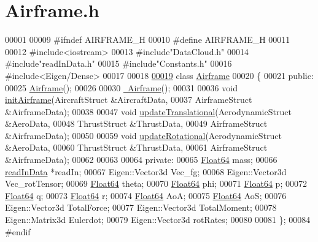 \hypertarget{_airframe_8h_source}{}\section{Airframe.\+h}
\label{_airframe_8h_source}

\begin{DoxyCode}
00001 
00009 \textcolor{preprocessor}{#ifndef AIRFRAME\_H}
00010 \textcolor{preprocessor}{#define AIRFRAME\_H}
00011 
00012 \textcolor{preprocessor}{#include<iostream>}
00013 \textcolor{preprocessor}{#include"DataCloud.h"}
00014 \textcolor{preprocessor}{#include"readInData.h"}
00015 \textcolor{preprocessor}{#include"Constants.h"}
00016 \textcolor{preprocessor}{#include<Eigen/Dense>}
00017 
00018 
\hyperlink{group___airframe}{00019} \textcolor{keyword}{class }\hyperlink{group___airframe_class_airframe}{Airframe}
00020 \{
00021 \textcolor{keyword}{public}:
00025     \hyperlink{group___airframe_a5e6632c7d0c5bc5b889de6cc2407944f}{Airframe}();
00026 
00030     \hyperlink{group___airframe_af849116afbf7c4d7d2d5c189ff68cb7d}{~Airframe}();
00031 
00036     \textcolor{keywordtype}{void} \hyperlink{group___airframe_a57b5f7a74d11723186f34fc183e1581b}{initAirframe}(AircraftStruct    &AircraftData,
00037                       AirframeStruct    &AirframeData);
00038 
00047     \textcolor{keywordtype}{void} \hyperlink{group___airframe_a29b3a2854700f77468b6a94c5b7d0372}{updateTranslational}(AerodynamicStruct  &AeroData,
00048                              ThrustStruct       &ThrustData,
00049                             AirframeStruct &AirframeData);
00050 
00059     \textcolor{keywordtype}{void} \hyperlink{group___airframe_acf8ce5ef44d07ca8815ca36d13cffcc7}{updateRotational}(AerodynamicStruct  &AeroData,
00060                             ThrustStruct        &ThrustData,
00061                             AirframeStruct &AirframeData);
00062 
00063 
00064 \textcolor{keyword}{private}:
00065     \hyperlink{group___tools_ga3f1431cb9f76da10f59246d1d743dc2c}{Float64} mass;
00066     \hyperlink{classread_in_data}{readInData} *readIn;
00067     Eigen::Vector3d Vec\_fg;
00068     Eigen::Vector3d Vec\_rotTensor;
00069     \hyperlink{group___tools_ga3f1431cb9f76da10f59246d1d743dc2c}{Float64} theta;
00070     \hyperlink{group___tools_ga3f1431cb9f76da10f59246d1d743dc2c}{Float64} phi;
00071     \hyperlink{group___tools_ga3f1431cb9f76da10f59246d1d743dc2c}{Float64} p;
00072     \hyperlink{group___tools_ga3f1431cb9f76da10f59246d1d743dc2c}{Float64} q;
00073     \hyperlink{group___tools_ga3f1431cb9f76da10f59246d1d743dc2c}{Float64} r;
00074     \hyperlink{group___tools_ga3f1431cb9f76da10f59246d1d743dc2c}{Float64} AoA;
00075     \hyperlink{group___tools_ga3f1431cb9f76da10f59246d1d743dc2c}{Float64} AoS;
00076     Eigen::Vector3d TotalForce;
00077     Eigen::Vector3d TotalMoment;
00078     Eigen::Matrix3d Eulerdot;
00079     Eigen::Vector3d rotRates;
00080 
00081 \};
00084 \textcolor{preprocessor}{#endif }
\end{DoxyCode}
